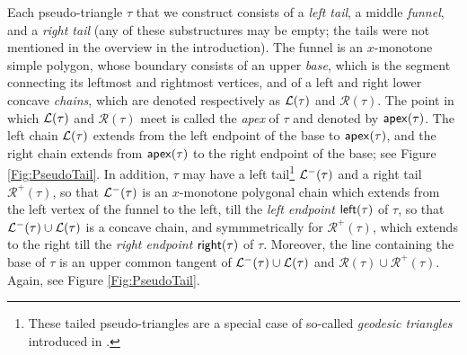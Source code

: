 \documentclass[11pt]{article}
\def\L{{\cal L}}
\def\R{\mathcal{R}}
\def\Left{{\sf left}}
\def\Right{{\sf right}}
\def\apex{{\sf apex}}
\begin{document}
Each pseudo-triangle $\tau$ that we construct consists of a \textit{left tail}, a middle \textit{funnel}, and a \textit{right tail}
(any of these substructures may be empty; the tails were not mentioned in the overview in the introduction). The funnel
is an $x$-monotone simple polygon, whose
boundary consists of an upper \textit{base}, which is the segment connecting
its leftmost and rightmost vertices, and of a left and right lower concave
\textit{chains}, which are denoted respectively as $\L(\tau)$ and
$\R(\tau)$. The point in which $\L(\tau)$ and $\R(\tau)$  meet
is called  the \textit{apex} of $\tau$ and denoted
by $\apex(\tau)$. The left chain $\L(\tau)$ extends from the left endpoint of the base to $\apex(\tau)$, and the right chain extends from
$\apex(\tau)$ to the right endpoint of the base; see Figure
\ref{Fig:PseudoTail}.  
In addition, $\tau$ may have a left tail\footnote{\small These tailed pseudo-triangles are a special case of so-called \textit{geodesic triangles} introduced in \cite{Geodesic}.}
$\L^-(\tau)$ and a right tail $\R^+(\tau)$, so that $\L^-(\tau)$ is an $x$-monotone polygonal chain which
extends from the left vertex of the funnel to the left, till the {\em left
endpoint\/} $\Left(\tau)$ of $\tau$, so that $\L^-(\tau)\cup \L(\tau)$ is
a concave chain, and symmmetrically for $\R^+(\tau)$, which extends to
the right till the {\em right endpoint\/} $\Right(\tau)$ of $\tau$. Moreover, the line containing the base of $\tau$ is an upper common tangent of $\L^-(\tau)\cup \L(\tau)$ and $\R(\tau)\cup \R^+(\tau)$. Again, see
Figure \ref{Fig:PseudoTail}.
\end{document}

